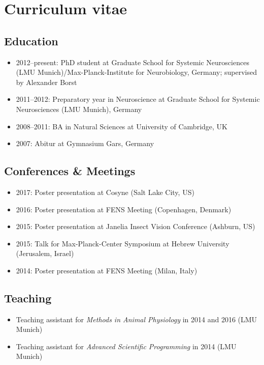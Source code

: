 \chapter*{Curriculum vitae}

\section*{Education}

\begin{itemize}
    \item 2012--present: PhD student at Graduate School for Systemic Neurosciences (LMU Munich)/Max-Planck-Institute for Neurobiology, Germany; supervised by Alexander Borst
    
    \item 2011--2012: Preparatory year in Neuroscience at Graduate School for Systemic Neurosciences (LMU Munich), Germany
    
    \item 2008--2011: BA in Natural Sciences at University of Cambridge, UK
    
    \item 2007: Abitur at Gymnasium Gars, Germany
\end{itemize}

\section*{Conferences \& Meetings}

\begin{itemize}
     \item 2017: Poster presentation at Cosyne (Salt Lake City, US)
     \item 2016: Poster presentation at FENS Meeting (Copenhagen, Denmark)
     \item 2015: Poster presentation at Janelia Insect Vision Conference (Ashburn, US)
     \item 2015: Talk for Max-Planck-Center Symposium at Hebrew University (Jerusalem, Israel)
     \item 2014: Poster presentation at FENS Meeting (Milan, Italy)
\end{itemize}

\section*{Teaching}

\begin{itemize}
     \item Teaching assistant for \textit{Methods in Animal Physiology} in 2014 and 2016 (LMU Munich)
     \item Teaching assistant for \textit{Advanced Scientific Programming} in 2014 (LMU Munich)
\end{itemize}

